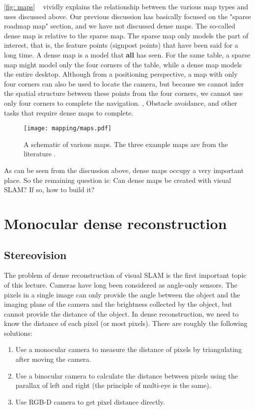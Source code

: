 \autoref{fig: maps} ~ vividly explains the relationship between the various map types and uses discussed above. Our previous discussion has basically focused on the "sparse roadmap map" section, and we have not discussed dense maps. The so-called dense map is relative to the sparse map. The sparse map only models the part of interest, that is, the feature points (signpost points) that have been said for a long time. A dense map is a model that \textbf{all} has seen. For the same table, a sparse map might model only the four corners of the table, while a dense map models the entire desktop. Although from a positioning perspective, a map with only four corners can also be used to locate the camera, but because we cannot infer the spatial structure between these points from the four corners, we cannot use only four corners to complete the navigation. , Obstacle avoidance, and other tasks that require dense maps to complete.

\begin{figure}[! ht]
\centering
\texttt{[image: mapping/maps.pdf]}
\caption{A schematic of various maps. The three example maps are from the literature \cite{Mur-Artal2015, Labbe2014, Salas-Moreno2013}. }
\label{fig: maps}
\end{figure}

As can be seen from the discussion above, dense maps occupy a very important place. So the remaining question is: Can dense maps be created with visual SLAM? If so, how to build it?

\section{Monocular dense reconstruction}
\subsection{Stereovision}
The problem of dense reconstruction of visual SLAM is the first important topic of this lecture. Cameras have long been considered as angle-only sensors. The pixels in a single image can only provide the angle between the object and the imaging plane of the camera and the brightness collected by the object, but cannot provide the distance of the object. In dense reconstruction, we need to know the distance of each pixel (or most pixels). There are roughly the following solutions:

\begin{enumerate}
\item Use a monocular camera to measure the distance of pixels by triangulating after moving the camera.
\item Use a binocular camera to calculate the distance between pixels using the parallax of left and right (the principle of multi-eye is the same).
\item Use RGB-D camera to get pixel distance directly.
\end{enumerate}

